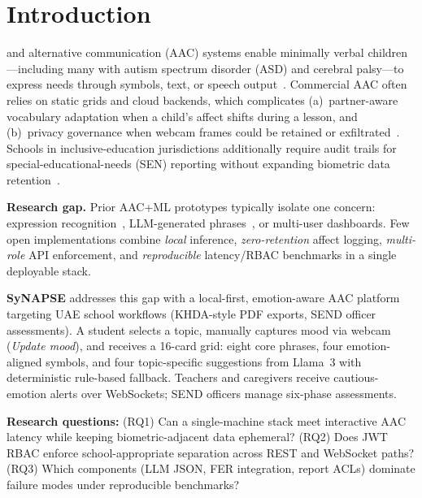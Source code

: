\documentclass[conference]{IEEEtran}
\begin{document}
\section{Introduction}
 and alternative communication (AAC) systems enable minimally verbal children---including many with autism spectrum disorder (ASD) and cerebral palsy---to express needs through symbols, text, or speech output~\cite{asha2023}. Commercial AAC often relies on static grids and cloud backends, which complicates (a)~partner-aware vocabulary adaptation when a child's affect shifts during a lesson, and (b)~privacy governance when webcam frames could be retained or exfiltrated~\cite{monkaresi2017,unicef2021}. Schools in inclusive-education jurisdictions additionally require audit trails for special-educational-needs (SEN) reporting without expanding biometric data retention~\cite{khda2017,who2022}.

\textbf{Research gap.} Prior AAC+ML prototypes typically isolate one concern: expression recognition~\cite{serengil2020}, LLM-generated phrases~\cite{aslan2021}, or multi-user dashboards. Few open implementations combine \emph{local} inference, \emph{zero-retention} affect logging, \emph{multi-role} API enforcement, and \emph{reproducible} latency/RBAC benchmarks in a single deployable stack.

\textbf{SyNAPSE} addresses this gap with a local-first, emotion-aware AAC platform targeting UAE school workflows (KHDA-style PDF exports, SEND officer assessments). A student selects a topic, manually captures mood via webcam (\emph{Update mood}), and receives a 16-card grid: eight core phrases, four emotion-aligned symbols, and four topic-specific suggestions from Llama~3 with deterministic rule-based fallback. Teachers and caregivers receive cautious-emotion alerts over WebSockets; SEND officers manage six-phase assessments.

\textbf{Research questions:} (RQ1) Can a single-machine stack meet interactive AAC latency while keeping biometric-adjacent data ephemeral? (RQ2) Does JWT RBAC enforce school-appropriate separation across REST and WebSocket paths? (RQ3) Which components (LLM JSON, FER integration, report ACLs) dominate failure modes under reproducible benchmarks?
\end{document}

